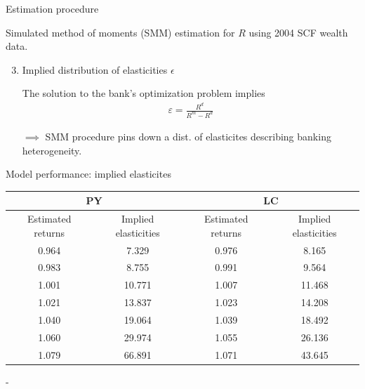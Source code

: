 \documentclass{beamer}
\begin{document}
\begin{frame}{Estimation procedure}

Simulated method of moments (SMM) estimation for $R$ using 2004 SCF wealth data.

\begin{enumerate}
  \setcounter{enumi}{2} 
\item Implied distribution of elasticities $\epsilon$
  \par The solution to the bank's optimization problem implies
  \begin{align}
    \varepsilon = \frac{R^d}{R^m - R^d}
  \end{align}

  \par $\implies$ SMM procedure pins down a dist. of elasticites describing banking heterogeneity.
  \end{enumerate}

\end{frame}

\begin{frame}{Model performance: implied elasticites}

  \begin{center}
\begin{tabular}{|c|c|c|c|}
\hline
\multicolumn{2}{|c|}{PY} & \multicolumn{2}{|c|}{LC} \\
\hline
Estimated returns & Implied elasticities & Estimated returns & Implied elasticities \\
\hline
0.964 & 7.329 & 0.976 & 8.165 \\
0.983 & 8.755 & 0.991 & 9.564 \\
1.001 & 10.771 & 1.007 & 11.468 \\
1.021 & 13.837 & 1.023 & 14.208 \\
1.040 & 19.064 & 1.039 & 18.492 \\
1.060 & 29.974 & 1.055 & 26.136 \\
1.079 & 66.891 & 1.071 & 43.645 \\
\hline
\end{tabular}
\end{center}

\vspace{2.5mm}
\cite{Genay2004} - 

\end{frame}
\end{document}
